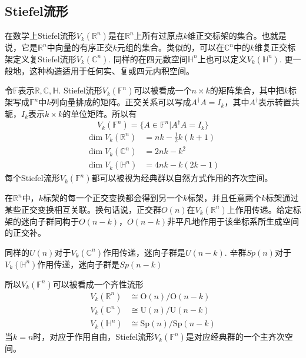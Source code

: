 \documentclass{article}
\numberwithin{equation}{subsection}
\begin{document}
\subsection{Stiefel流形}
在数学上Stiefel流形$V_k(\mathbb{R}^n)$是在$\mathbb{R}^n$上所有过原点$k$维正交标架的集合。也就是说，它是$\mathbb{R}^{n}$中向量的有序正交$k$元组的集合。类似的，可以在$\mathbb{C}^n$中的$k$维复正交标架定义复Stiefel流形$V_k(\mathbb{C}^n)$. 同样的在四元数空间$\mathbb{H}^n$上也可以定义$V_k(\mathbb{H}^n)$. 更一般地，这种构造适用于任何实、复或四元内积空间。

令$\mathbb{F}$表示$\mathbb{R},\mathbb{C},\mathbb{H}$. Stiefel流形$V_k(\mathbb{F}^n)$可以被看成一个$n\times k$的矩阵集合，其中把$k$标架写成$\mathbb{F}^n$中$k$列向量排成的矩阵。正交关系可以写成$A^{\dagger}A=I_k$，其中$A^\dagger$表示转置共轭，$I_k$表示$k\times k$的单位矩阵。所以有
\begin{equation}
    V_k(\mathbb{F}^n)=\{A\in\mathbb{F}^n|A^\dagger A=I_k\}
\end{equation}
\begin{equation}
    \begin{aligned}
    \operatorname{dim} V_{k}\left(\mathbb{R}^{n}\right) &=n k-\frac{1}{2} k(k+1) \\
    \operatorname{dim} V_{k}\left(\mathbb{C}^{n}\right) &=2 n k-k^{2} \\
    \operatorname{dim} V_{k}\left(\mathbb{H}^{n}\right) &=4 n k-k(2 k-1)
    \end{aligned}
\end{equation}
每个Stiefel流形$V_{k}(\mathbb{F}^{n})$都可以被视为经典群以自然方式作用的齐次空间。

在$\mathbb{R}^{n}$中，$k$标架的每一个正交变换都会得到另一个$k$标架，并且任意两个$k$标架通过某些正交变换相互关联。换句话说，正交群$O(n)$在$V_k(\mathbb{R}^n)$上作用传递。给定标架的迷向子群同构于$O(n-k)$，$O(n−k)$非平凡地作用于该坐标系所生成空间的正交补。

同样的$U(n)$对于$V_k(\mathbb{C}^n)$作用传递，迷向子群是$U(n-k)$. 辛群$Sp(n)$对于$V_k(\mathbb{H}^n)$作用传递，迷向子群是$Sp(n-k)$

所以$V_k(\mathbb{F}^n)$可以被看成一个齐性流形
\begin{equation}
    \begin{aligned}
    V_{k}\left(\mathbb{R}^{n}\right) & \cong \mathrm{O}(n) / \mathrm{O}(n-k) \\
    V_{k}\left(\mathbb{C}^{n}\right) & \cong \mathrm{U}(n) / \mathrm{U}(n-k) \\
    V_{k}\left(\mathbb{H}^{n}\right) & \cong \mathrm{Sp}(n) / \mathrm{Sp}(n-k)
    \end{aligned}
\end{equation}
当$k=n$时，对应于作用自由，Stiefel流形$V_k(\mathbb{F}^n)$是对应经典群的一个主齐次空间。
\end{document}

